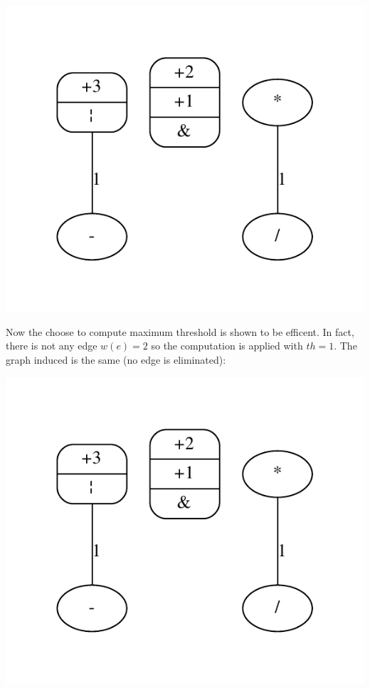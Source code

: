 \begin{DoxyImageNoCaption}
  \mbox{\includegraphics[width=\textwidth,height=\textheight/2,keepaspectratio=true]{dot_inline_dotgraph_15}}
\end{DoxyImageNoCaption}
 Now the choose to compute maximum threshold is shown to be efficent. In fact, there is not any edge $ w(e)=2 $ so the computation is applied with $ th=1 $. The graph induced is the same (no edge is eliminated)\+: 
\begin{DoxyImageNoCaption}
  \mbox{\includegraphics[width=\textwidth,height=\textheight/2,keepaspectratio=true]{dot_inline_dotgraph_16}}
\end{DoxyImageNoCaption}
